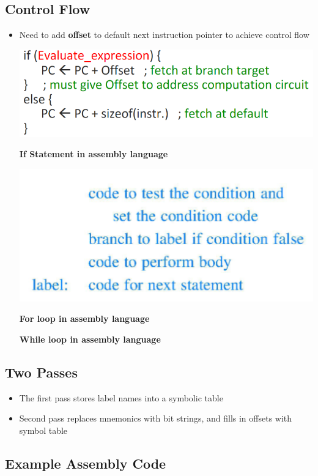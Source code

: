 \documentclass{article}
\begin{document}
\subsection{Control Flow}
\begin{itemize}
    \item Need to add \textbf{offset} to default next instruction pointer to achieve control flow
    
    \includegraphics[scale=0.35]{images/slide1.png}
    
    \textbf{If Statement in assembly language}
    
    \includegraphics[scale=0.4]{images/if.png}
    
    \textbf{For loop in assembly language}
    
    \textbf{While loop in assembly language}
   
\end{itemize}

\subsection{Two Passes}
\begin{itemize}
    \item The first pass stores label names into a symbolic table
    \item Second pass replaces mnemonics with bit strings, and fills in offsets with symbol table
\end{itemize}

\subsection{Example Assembly Code}
\end{document}
